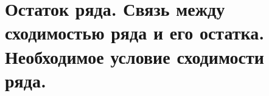 {
	\section{Остаток ряда. Связь между сходимостью ряда и его остатка. Необходимое условие сходимости ряда.}

	\newpage
}